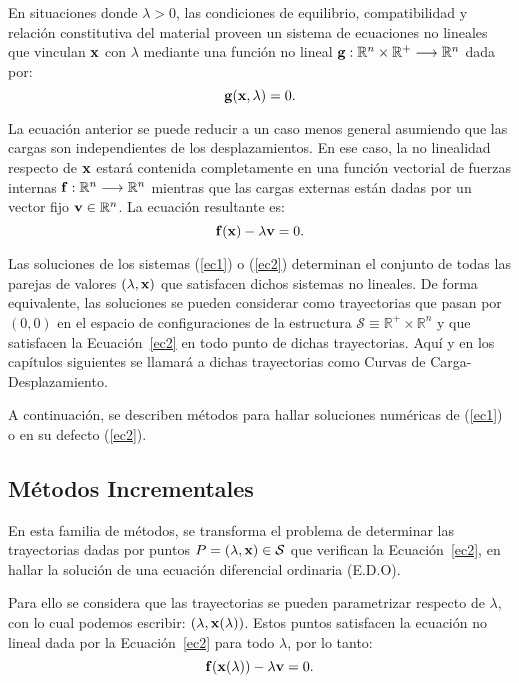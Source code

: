 En situaciones donde $\lambda>0$, las condiciones de equilibrio, compatibilidad y relación constitutiva del material proveen un sistema de ecuaciones no lineales que vinculan ${\bf x}$ con $\lambda$ mediante una función no lineal ${\bf g}:\mathbb{R}^n \times \mathbb{R}^+ \longrightarrow \mathbb{R}^n$ dada por:
%
\begin{equation}\label{ec1}
{\bf g}({\bf x},\lambda)=0.
\end{equation}

La ecuación anterior se puede reducir a un caso menos general asumiendo que las cargas son independientes de los desplazamientos. En ese caso, la no linealidad respecto de ${\bf x}$ estará contenida completamente en una función vectorial de fuerzas internas ${\bf f}:\mathbb{R}^n \longrightarrow \mathbb{R}^n$ mientras que las cargas externas están dadas por un vector fijo ${\bf v} \in \mathbb{R}^n$. %
%
La ecuación resultante es:
%
\begin{equation}\label{ec2}
{\bf f}({\bf x})-\lambda {\bf v}=0.
\end{equation}

Las soluciones de los sistemas (\ref{ec1}) o (\ref{ec2}) determinan el conjunto de todas las parejas de valores $(\lambda,{\bf x})$ que satisfacen dichos sistemas no lineales. De forma equivalente, las soluciones se pueden considerar como trayectorias que pasan por $(0,0)$ en el espacio de configuraciones de la estructura $\mathcal{S} \equiv \mathbb{R}^+ \times \mathbb{R}^n$ y que satisfacen la Ecuación~\eqref{ec2} en todo punto de dichas trayectorias. Aquí y en los capítulos siguientes se llamará a dichas trayectorias como Curvas de Carga-Desplazamiento.

A continuación, se describen métodos para hallar soluciones numéricas de (\ref{ec1}) o en su defecto (\ref{ec2}).

\subsection{Métodos Incrementales}\label{Increm}

En esta familia de métodos, se transforma el problema de determinar las trayectorias dadas por puntos $P=(\lambda,{\bf x})\in\mathcal{S}$ que verifican la Ecuación~\eqref{ec2}, en hallar la solución de una ecuación diferencial ordinaria (E.D.O).

Para ello se considera que las trayectorias se pueden parametrizar respecto de $\lambda$, con lo cual podemos escribir: $(\lambda,{\bf x}(\lambda))$. Estos puntos satisfacen la ecuación no lineal dada por la Ecuación~\eqref{ec2} para todo $\lambda$, por lo tanto:
%
\begin{equation}\label{ec3}
{\bf f}({\bf x}(\lambda))-\lambda {\bf v}=0.
\end{equation}

